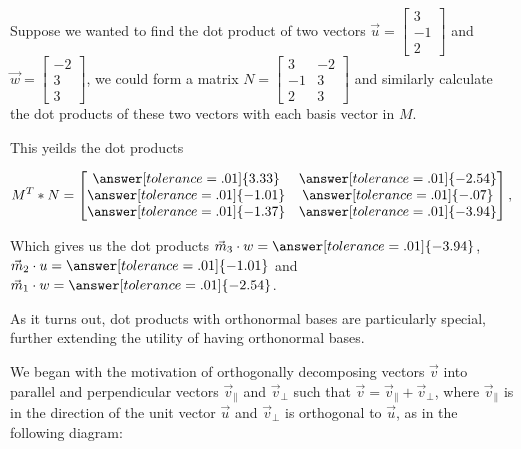 \documentclass{ximera}
\begin{document}
\begin{example}
   Suppose we wanted to find the dot product of two vectors $\vec{u}=\begin{bmatrix}
   3\\-1\\2
   \end{bmatrix}$ and $\vec{w}=\begin{bmatrix}
      -2\\3\\3
   \end{bmatrix}$, we could form a matrix $N=\begin{bmatrix}3&-2\\-1&3\\2&3
   \end{bmatrix}$ and similarly calculate the dot products of these two vectors with each basis vector in $M$. 

   This yeilds the dot products

   $$M^T*N=\begin{bmatrix}
      \answer[tolerance=.01]{3.33}&\answer[tolerance=.01]{-2.54}\\\answer[tolerance=.01]{-1.01}&\answer[tolerance=.01]{-.07}\\
      \answer[tolerance=.01]{-1.37}&\answer[tolerance=.01]{-3.94}
   \end{bmatrix},$$

   Which gives us the dot products $\vec{m}_3\cdot w=\answer[tolerance=.01]{-3.94}$, $\vec{m}_2\cdot u=\answer[tolerance=.01]{-1.01}$ and $\vec{m}_1\cdot w=\answer[tolerance=.01]{-2.54}$.

\end{example}

As it turns out, dot products with orthonormal bases are particularly special, further extending the utility of having orthonormal bases.

We began with the motivation of orthogonally decomposing vectors $\vec{v}$ into parallel and perpendicular vectors $\vec{v}_\parallel$ and $\vec{v}_\perp$ such that $\vec{v}=\vec{v}_\parallel+\vec{v}_\perp$, where $\vec{v}_\parallel$ is in the direction of the unit vector $\vec{u}$ and $\vec{v}_\perp$ is orthogonal to $\vec{u}$, as in the following diagram:

\begin{center}
   
  \end{center}
\end{document}
